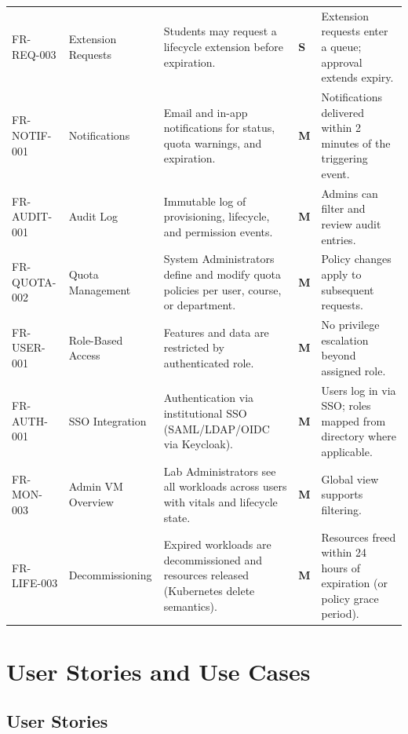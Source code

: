 \documentclass[12pt,a4paper]{article}
\newcommand{\Must}{\textcolor{dangered}{\textbf{M}}}
\newcommand{\Should}{\textcolor{warningyellow}{\textbf{S}}}
\begin{document}
\begin{longtable}{@{}L{2.1cm}L{1.8cm}L{5cm}C{1.4cm}L{5cm}@{}}
  FR-REQ-003 & Extension Requests & Students may request a lifecycle extension before expiration. & \Should & Extension requests enter a queue; approval extends expiry. \\
    FR-NOTIF-001 & Notifications & Email and in-app notifications for status, quota warnings, and expiration. & \Must & Notifications delivered within 2 minutes of the triggering event. \\
  FR-AUDIT-001 & Audit Log & Immutable log of provisioning, lifecycle, and permission events. & \Must & Admins can filter and review audit entries. \\
    FR-QUOTA-002 & Quota Management & System Administrators define and modify quota policies per user, course, or department. & \Must & Policy changes apply to subsequent requests. \\
  FR-USER-001 & Role-Based Access & Features and data are restricted by authenticated role. & \Must & No privilege escalation beyond assigned role. \\
    FR-AUTH-001 & SSO Integration & Authentication via institutional SSO (SAML/LDAP/OIDC via Keycloak). & \Must & Users log in via SSO; roles mapped from directory where applicable. \\
  FR-MON-003 & Admin VM Overview & Lab Administrators see all workloads across users with vitals and lifecycle state. & \Must & Global view supports filtering. \\
    FR-LIFE-003 & Decommissioning & Expired workloads are decommissioned and resources released (Kubernetes delete semantics). & \Must & Resources freed within 24 hours of expiration (or policy grace period). \\
\end{longtable}

\newpage
\section{User Stories and Use Cases}

\subsection{User Stories}
\end{document}
